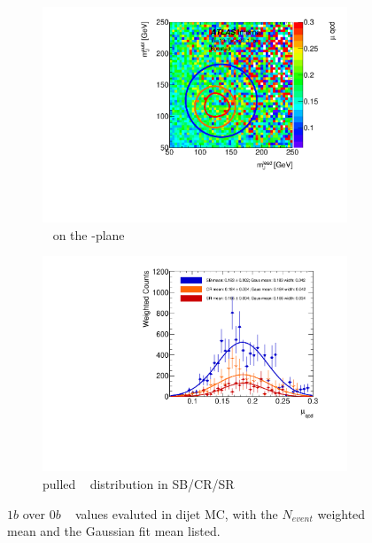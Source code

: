\begin{figure}[htbp!]
\centering
\captionsetup{justification=centering}
	\hspace{-1cm}
    \begin{subfigure}[b]{0.4\textwidth}
        \includegraphics[width=\textwidth,angle=-90]{figures/boosted/AppendixMuqcdstudy/QCD_OneTag_Incl_mH0H1.pdf}
        \caption{\muqcd~ on the \mleadJ-\msublJ plane}
        \label{fig:app-muqcd-1b-2d-qcd}
    \end{subfigure}
    \quad \quad \quad \quad 
    \begin{subfigure}[b]{0.4\textwidth}
        \includegraphics[width=\textwidth,angle=-90]{figures/boosted/AppendixMuqcdstudy/QCD_OneTag_Incl_mH0H1_pull.pdf}
        \caption{pulled \muqcd~ distribution in SB/CR/SR}
        \label{fig:app-muqcd-1b-pull-qcd}
    \end{subfigure}
\caption{$1b$ over $0b$ \muqcd~ values evaluted in dijet MC, with the $N_{event}$ weighted mean and the Gaussian fit mean listed.}
\label{fig:app-muqcd-1b-qcd}
\end{figure}

